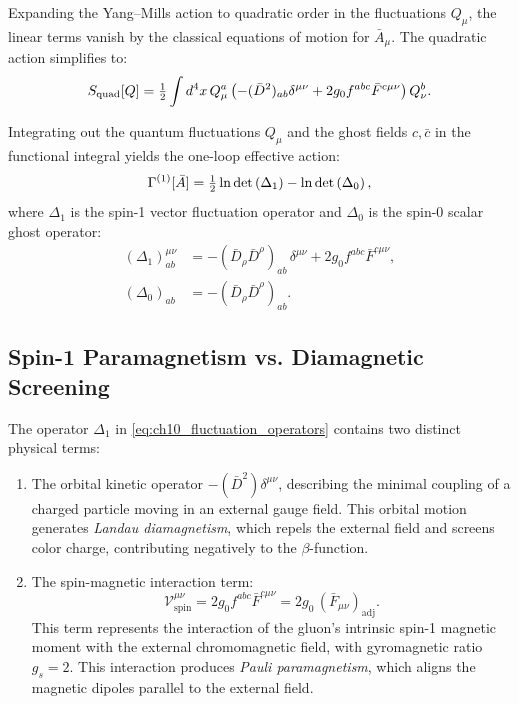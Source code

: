 Expanding the Yang--Mills action to quadratic order in the fluctuations $Q_\mu$, the linear terms vanish by the classical equations of motion for $\bar{A}_\mu$. The quadratic action simplifies to:
\begin{equation}
\label{eq:ch10_quadratic_action_fluct}
S_{\mathrm{quad}}[Q] = \tfrac{1}{2} \int d^4x \, Q_\mu^a \left( -(\bar{D}^2)_{ab} \delta^{\mu\nu} + 2 g_0 f^{abc} \bar{F}^{c\mu\nu} \right) Q_\nu^b.
\end{equation}

Integrating out the quantum fluctuations $Q_\mu$ and the ghost fields $c, \bar{c}$ in the functional integral yields the one-loop effective action:
\begin{equation}
\label{eq:ch10_one_loop_effective_action}
\Gamma^{(1)}[\bar{A}] = \tfrac{1}{2} \ln \det\left( \Delta_1 \right) - \ln \det\left( \Delta_0 \right),
\end{equation}
where $\Delta_1$ is the spin-1 vector fluctuation operator and $\Delta_0$ is the spin-0 scalar ghost operator:
\begin{align}
\label{eq:ch10_fluctuation_operators}
(\Delta_1)^{\mu\nu}_{ab} &= -(\bar{D}_\rho \bar{D}^\rho)_{ab} \, \delta^{\mu\nu} + 2 g_0 f^{abc} \bar{F}^{c\mu\nu}, \\
(\Delta_0)_{ab} &= -(\bar{D}_\rho \bar{D}^\rho)_{ab}.
\end{align}

\subsection{Spin-1 Paramagnetism vs. Diamagnetic Screening}
\label{subsec:paramagnetism_diamagnetism}

The operator $\Delta_1$ in \eqref{eq:ch10_fluctuation_operators} contains two distinct physical terms:
\begin{enumerate}
    \item The orbital kinetic operator $-(\bar{D}^2) \delta^{\mu\nu}$, describing the minimal coupling of a charged particle moving in an external gauge field. This orbital motion generates \emph{Landau diamagnetism}, which repels the external field and screens color charge, contributing negatively to the $\beta$-function.
    \item The spin-magnetic interaction term:
    \begin{equation}
    \label{eq:ch10_spin_magnetic_term}
    \mathcal{V}_{\mathrm{spin}}^{\mu\nu} = 2 g_0 f^{abc} \bar{F}^{c\mu\nu} = 2 g_0 \, (\bar{F}_{\mu\nu})_{\mathrm{adj}}.
    \end{equation}
    This term represents the interaction of the gluon's intrinsic spin-1 magnetic moment with the external chromomagnetic field, with gyromagnetic ratio $g_s = 2$. This interaction produces \emph{Pauli paramagnetism}, which aligns the magnetic dipoles parallel to the external field.
\end{enumerate}

